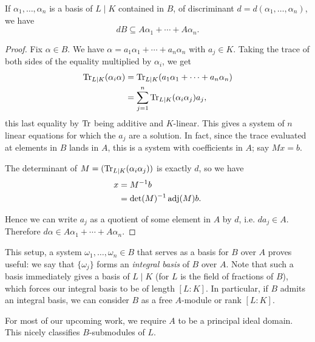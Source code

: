 \begin{lem}
	If $\alpha_1,\dots,\alpha_n$ is a basis of $L\mid K$ contained in $B$, of discriminant $d=d(\alpha_1,\dots,\alpha_n)$, we have
	\[
		dB\subseteq A\alpha_1 + \cdots + A\alpha_n.
	\]
\end{lem}
\begin{proof}
	Fix $\alpha\in B$. We have $\alpha=a_1\alpha_1+\cdots+a_n\alpha_n$ with $a_j\in K$. Taking the trace of both sides of the equality multiplied by $\alpha_i$, we get
	\begin{align*}
		\operatorname{Tr}_{L\mid K}(\alpha_i \alpha) &= \operatorname{Tr}_{L\mid K}(a_1\alpha_1+\cdots+a_n\alpha_n)\\
			&= \sum_{j=1}^n \operatorname{Tr}_{L\mid K}(\alpha_i\alpha_j) a_j,
	\end{align*}
	this last equality by $\operatorname{Tr}$ being additive and $K$-linear. This gives a system of $n$ linear equations for which the $a_j$ are a solution. In fact, since the trace evaluated at elements in $B$ lands in $A$, this is a system with coefficients in $A$; say $Mx=b$.

	The determinant of $M=(\operatorname{Tr}_{L\mid K}(\alpha_i\alpha_j))$ is exactly $d$, so we have
	\begin{align*}
		x &= M^{-1} b\\
		  &= \det(M)^{-1}\operatorname{adj}(M)b.
	\end{align*}
	
	Hence we can write $a_j$ as a quotient of some element in $A$ by $d$, i.e. $da_j\in A$. Therefore $d\alpha\in A\alpha_1+\cdots+A\alpha_n$.
\end{proof}

This setup, a system $\omega_1,\dots,\omega_n\in B$ that serves as a basis for $B$ over $A$ proves useful: we say that $\{\omega_j\}$ forms an \emph{integral basis} of $B$ over $A$. Note that such a basis immediately gives a basis of $L\mid K$ (for $L$ is the field of fractions of $B$), which forces our integral basis to be of length $[L:K]$. In particular, if $B$ admits an integral basis, we can consider $B$ as a free $A$-module or rank $[L:K]$.

For most of our upcoming work, we require $A$ to be a principal ideal domain. This nicely classifies $B$-submodules of $L$.


